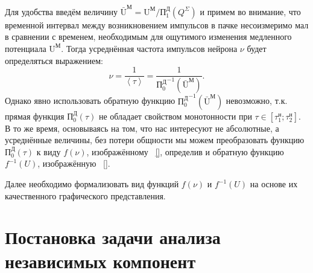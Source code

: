 \begin{figure}[ht]
    \caption{}
    \label{img:ia_thresholds}
\end{figure}

Для удобства введём величину $\bar{\text{U}}^\text{М} = \text{U}^\text{М} / \text{П}_{1}^\text{Д}(Q^\Sigma)$ и примем во внимание, что временной интервал между возникновением импульсов в пачке несоизмеримо мал в сравнении с временем, необходимым для ощутимого изменения медленного потенциала $\text{U}^\text{М}$. Тогда усреднённая частота импульсов нейрона $\nu$ будет определяться выражением: $$ \nu = \dfrac{1}{\left<\tau\right>} = \dfrac{1}{{\text{П}_{0}^\text{Д}}^{-1}(\bar{\text{U}}^\text{М})}.$$ Однако явно использовать обратную функцию ${\text{П}_{0}^\text{Д}}^{-1}(\bar{\text{U}}^\text{М})$ невозможно, т.к. прямая функция $\text{П}_{0}^\text{Д}(\tau)$ не обладает свойством монотонности при $\tau \in \left[ \tau_{1}^{\text{н}}; \tau_{2}^{\text{н}} \right]$. В то же время, основываясь на том, что нас интересуют не абсолютные, а усреднённые величины, без потери общности мы можем преобразовать функцию $\text{П}_{0}^\text{Д}(\tau)$ к виду $f(\nu)$, изображённому \onfigure~\ref{}, определив и обратную функцию $f^{-1}(U)$, изображённую \onfigure~\ref{}.

Далее необходимо формализовать вид функций $f(\nu)$ и $f^{-1}(U)$ на основе их качественного графического представления.


\section{Постановка задачи анализа независимых компонент}  \label{appendix:math:ica_description}

